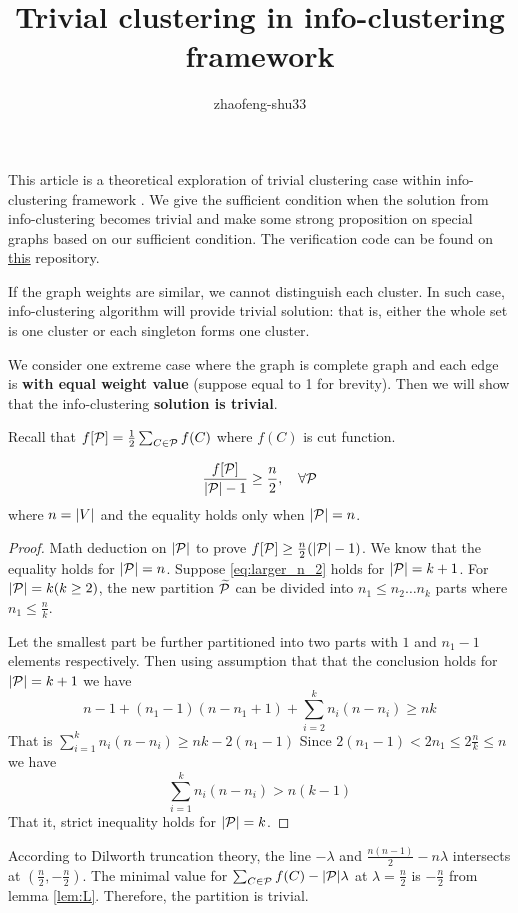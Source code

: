 \documentclass{article}
\title{Trivial clustering in info-clustering framework}
\author{zhaofeng-shu33}
\begin{document}
\maketitle
This article is a theoretical exploration of trivial clustering case within info-clustering framework \cite{ic}.
We give the sufficient condition when the solution from info-clustering becomes trivial and
make some strong proposition on special graphs based on our sufficient condition. The verification code can be found on \href{https://gitee.com/freewind201301/info-clustering-special-case-verification}{this} repository.

If the graph weights are similar, we cannot distinguish each cluster. 
In such case, info-clustering algorithm will provide trivial solution: 
that is, either the whole set is one cluster or each singleton forms one cluster.

We consider one extreme case where the graph is complete graph and each edge is \textbf{with equal weight value} (suppose equal to 1 for brevity).
Then we will show that the info-clustering \textbf{solution is trivial}.

Recall that $f[\P] = \frac{1}{2}\sum_{C\in\P} f(C)$ where $f(C)$ is cut function.
\begin{lemma}\label{lem:L}
\begin{equation}\label{eq:larger_n_2}
\frac{f[\P]}{\abs{\P}-1} \geq \frac{n}{2}, \quad\forall \P
\end{equation}
where $n = \abs{V}$ and the equality holds only when $\abs{\P}=n$.
\end{lemma}
\begin{proof}
Math deduction on $\abs{\P}$ to prove $f[\P] \geq \frac{n}{2}(\abs{\P} - 1)$.  We know that the equality holds for $\abs{\P} = n$.
Suppose \eqref{eq:larger_n_2} holds for $\abs{\P} =k+1$. For $\abs{\P}=k(k\geq 2)$, the new partition $\widetilde{\P}$ can be divided into $n_1\leq n_2 \dots n_k$ parts where $n_1 \leq \frac{n}{k}$.

Let the smallest part be further partitioned into two parts with $1$ and $n_1-1$ elements respectively.
Then using assumption that that the conclusion holds for $\abs{\P}=k+1$ we have
$$
n-1 + (n_1-1)(n-n_1+1) + \sum_{i=2}^k n_i(n-n_i) \geq nk
$$
That is $\sum_{i=1}^k n_i(n-n_i) \geq nk - 2(n_1-1)$
Since $2(n_1-1)<2n_1\leq 2\frac{n}{k} \leq n$ we have
$$
 \sum_{i=1}^k n_i(n-n_i)  > n(k-1)
$$
That it, strict inequality holds for $\abs{\P}=k$.
\end{proof}
According to Dilworth truncation theory, the line $-\lambda$ and $\frac{n(n-1)}{2} - n\lambda$ intersects at $(\frac{n}{2}, -\frac{n}{2})$. The minimal value for $\sum_{C\in\P}f(C) -\abs{\P}\lambda$ at $\lambda = \frac{n}{2}$ is $-\frac{n}{2}$ from lemma \ref{lem:L}. Therefore, the partition is trivial.
\end{document}
